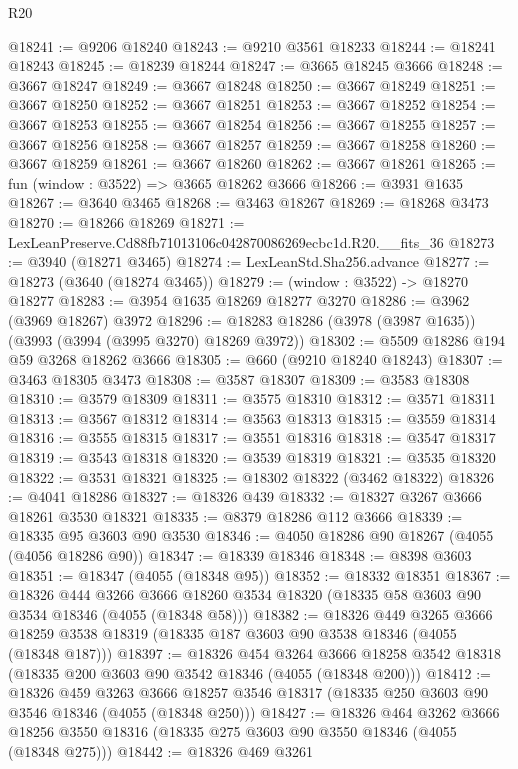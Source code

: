 \begin{lexlean}{R20}
\begin{coremodule}
@18241 := @9206 @18240
@18243 := @9210 @3561 @18233
@18244 := @18241 @18243
@18245 := @18239 @18244
@18247 := @3665 @18245 @3666
@18248 := @3667 @18247
@18249 := @3667 @18248
@18250 := @3667 @18249
@18251 := @3667 @18250
@18252 := @3667 @18251
@18253 := @3667 @18252
@18254 := @3667 @18253
@18255 := @3667 @18254
@18256 := @3667 @18255
@18257 := @3667 @18256
@18258 := @3667 @18257
@18259 := @3667 @18258
@18260 := @3667 @18259
@18261 := @3667 @18260
@18262 := @3667 @18261
@18265 := fun (window : @3522) => @3665 @18262 @3666
@18266 := @3931 @1635
@18267 := @3640 @3465
@18268 := @3463 @18267
@18269 := @18268 @3473
@18270 := @18266 @18269
@18271 := LexLeanPreserve.Cd88fb71013106c042870086269ecbc1d.R20.__fits_36
@18273 := @3940 (@18271 @3465)
@18274 := LexLeanStd.Sha256.advance
@18277 := @18273 (@3640 (@18274 @3465))
@18279 := (window : @3522) -> @18270 @18277
@18283 := @3954 @1635 @18269 @18277 @3270
@18286 := @3962 (@3969 @18267) @3972
@18296 := @18283 @18286 (@3978 (@3987 @1635)) (@3993 (@3994 (@3995 @3270) @18269 @3972))
@18302 := @5509 @18286 @194 @59 @3268 @18262 @3666
@18305 := @660 (@9210 @18240 @18243)
@18307 := @3463 @18305 @3473
@18308 := @3587 @18307
@18309 := @3583 @18308
@18310 := @3579 @18309
@18311 := @3575 @18310
@18312 := @3571 @18311
@18313 := @3567 @18312
@18314 := @3563 @18313
@18315 := @3559 @18314
@18316 := @3555 @18315
@18317 := @3551 @18316
@18318 := @3547 @18317
@18319 := @3543 @18318
@18320 := @3539 @18319
@18321 := @3535 @18320
@18322 := @3531 @18321
@18325 := @18302 @18322 (@3462 @18322)
@18326 := @4041 @18286
@18327 := @18326 @439
@18332 := @18327 @3267 @3666 @18261 @3530 @18321
@18335 := @8379 @18286 @112 @3666
@18339 := @18335 @95 @3603 @90 @3530
@18346 := @4050 @18286 @90 @18267 (@4055 (@4056 @18286 @90))
@18347 := @18339 @18346
@18348 := @8398 @3603
@18351 := @18347 (@4055 (@18348 @95))
@18352 := @18332 @18351
@18367 := @18326
    @444
    @3266
    @3666
    @18260
    @3534
    @18320
    (@18335 @58 @3603 @90 @3534 @18346 (@4055 (@18348 @58)))
@18382 := @18326
    @449
    @3265
    @3666
    @18259
    @3538
    @18319
    (@18335 @187 @3603 @90 @3538 @18346 (@4055 (@18348 @187)))
@18397 := @18326
    @454
    @3264
    @3666
    @18258
    @3542
    @18318
    (@18335 @200 @3603 @90 @3542 @18346 (@4055 (@18348 @200)))
@18412 := @18326
    @459
    @3263
    @3666
    @18257
    @3546
    @18317
    (@18335 @250 @3603 @90 @3546 @18346 (@4055 (@18348 @250)))
@18427 := @18326
    @464
    @3262
    @3666
    @18256
    @3550
    @18316
    (@18335 @275 @3603 @90 @3550 @18346 (@4055 (@18348 @275)))
@18442 := @18326
    @469
    @3261

\end{coremodule}
\end{lexlean}
